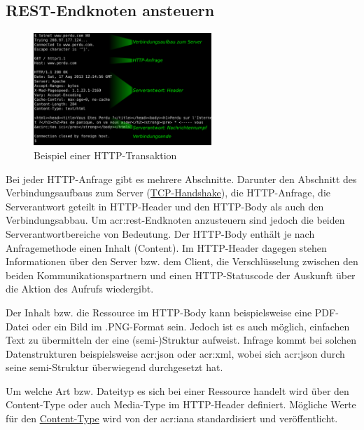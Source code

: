 \subsection{REST-Endknoten ansteuern}%
\label{sec:rest.ansteuern}

\begin{figure}
  \includegraphics[width=0.6\textwidth]{img/http-anfrage.png}
  \caption{Beispiel einer HTTP-Transaktion}
\end{figure}

Bei jeder HTTP-Anfrage gibt es mehrere Abschnitte. Darunter den Abschnitt des
Verbindungsaufbaus zum Server
(\href{http://www.rvs.uni-bielefeld.de/~heiko/tcpip/tcpip_html_alt/kap_2_4.html}{TCP-Handshake}),
die HTTP-Anfrage, die Serverantwort geteilt in HTTP-Header und den HTTP-Body als
auch den Verbindungsabbau. Um \acrshort{acr:rest}-Endknoten anzusteuern sind
jedoch die beiden Serverantwortbereiche von Bedeutung. Der HTTP-Body enthält je
nach Anfragemethode einen Inhalt (Content). Im HTTP-Header dagegen stehen
Informationen über den Server bzw. dem Client, die Verschlüsselung zwischen den
beiden Kommunikationspartnern und einen HTTP-Statuscode der Auskunft über die
Aktion des Aufrufs wiedergibt.

Der Inhalt bzw. die Ressource im HTTP-Body kann beispielsweise eine PDF-Datei
oder ein Bild im .PNG-Format sein. Jedoch ist es auch möglich, einfachen Text zu
übermitteln der eine (semi-)Struktur aufweist. Infrage kommt bei solchen
Datenstrukturen beispielsweise \acrfull{acr:json} oder \acrfull{acr:xml}, wobei
sich \acrshort{acr:json} durch seine semi-Struktur überwiegend durchgesetzt hat.

Um welche Art bzw. Dateityp es sich bei einer Ressource handelt wird über den
Content-Type oder auch Media-Type im HTTP-Header definiert. Mögliche Werte für
den
\href{http://www.iana.org/assignments/media-types/media-types.xhtml}{Content-Type}
wird von der \acrfull{acr:iana} standardisiert und veröffentlicht.

